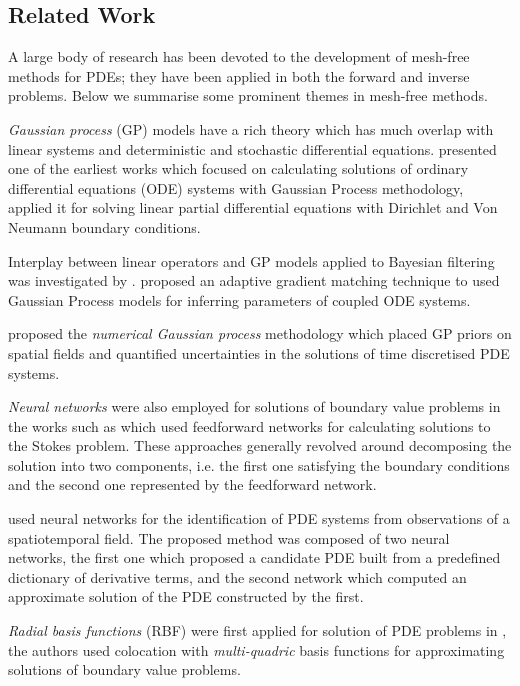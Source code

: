 \subsection{Related Work}

A large body of research has been devoted to the development of mesh-free methods for PDEs; they 
have been applied in both the forward and inverse problems. Below we summarise some prominent 
themes in mesh-free methods.

\emph{Gaussian process} (GP) models \citep{Rasmussen:2005:GPM:1162254} have a rich theory 
which has much overlap with linear systems and deterministic and stochastic differential equations. 
\citet{Skilling1992} presented one of the earliest works which focused on calculating solutions of 
ordinary differential equations (ODE) systems with Gaussian Process methodology, \citet{Graepel} 
applied it for solving linear partial differential equations with Dirichlet and Von Neumann 
boundary conditions.

Interplay between linear operators and GP models applied to Bayesian filtering was investigated by 
\citet{Sarkka2011}. \citet{pmlr-v31-dondelinger13a} proposed an adaptive gradient matching 
technique to used Gaussian Process models for inferring parameters of coupled ODE systems.

\citet{raissi2018numerical} proposed the \emph{numerical Gaussian process} methodology which placed 
GP priors on spatial fields and quantified uncertainties in the solutions of time discretised PDE 
systems.

\emph{Neural networks} were also employed for solutions of boundary value problems in the 
works such as \citet{Lagaris,Aarts2001,TSOULOS20092385,Baymani2011} which used feedforward networks 
for calculating solutions to the Stokes problem. These approaches generally revolved around 
decomposing the solution into two components, i.e. the first one satisfying the boundary conditions 
and the second one represented by the feedforward network.

\citet{raissi2018deep} used neural networks for the identification of PDE systems from 
observations of a spatiotemporal field. The proposed method was composed of two neural networks, 
the first one which proposed a candidate PDE built from a predefined dictionary of derivative 
terms, and the second network which computed an approximate solution of the PDE constructed by the 
first. 

\emph{Radial basis functions} (RBF) were first applied for solution of PDE problems in 
\citet{KANSA1990147}, the authors used colocation with \emph{multi-quadric} basis functions for 
approximating solutions of boundary value problems.

